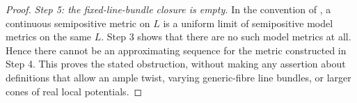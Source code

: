 \begin{proof}
\emph{Step 5: the fixed-line-bundle closure is empty.}
In the convention of \cite[Introduction]{GM19}, a continuous semipositive
metric on $L$ is a uniform limit of semipositive model metrics on
the same $L$. Step 3 shows that there are no such model metrics at
all. Hence there cannot be an approximating sequence for the metric
constructed in Step 4. This proves the stated obstruction, without
making any assertion about definitions that allow an ample twist,
varying generic-fibre line bundles, or larger cones of real local
potentials.
\end{proof}
